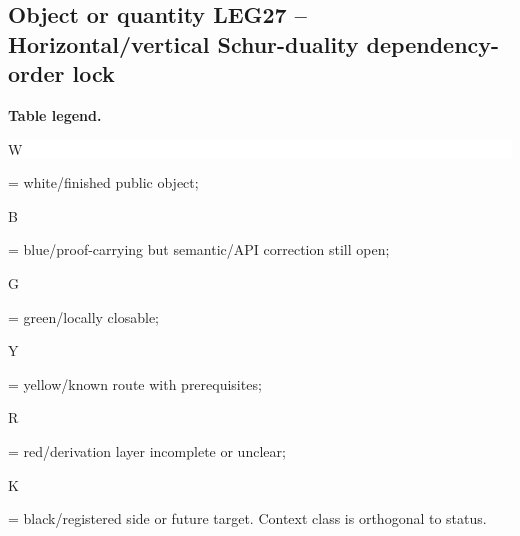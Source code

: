 \subsection*{Object or quantity LEG27 -- Horizontal/\allowbreak{}vertical Schur-duality dependency-order lock}
\hypertarget{objproof:LEG27}{}
\par\smallskip\noindent\begin{minipage}{0.99\linewidth}\footnotesize\raggedright\textbf{Table legend.} \colorbox{white}{\strut W} = white/finished public object; \colorbox{cyan!20}{\strut B} = blue/proof-carrying but semantic/API correction still open; \colorbox{green!18}{\strut G} = green/locally closable; \colorbox{yellow!25}{\strut Y} = yellow/known route with prerequisites; \colorbox{red!20}{\strut R} = red/derivation layer incomplete or unclear; \colorbox{black!18}{\strut K} = black/registered side or future target. Context class is orthogonal to status.\end{minipage}\par\vspace{0.25em}
